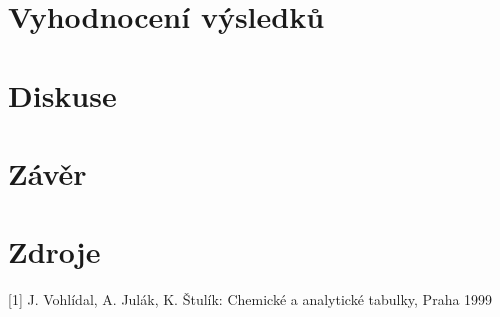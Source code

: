 \documentclass[12pt,a4paper]{article}
\begin{document}
\section*{Vyhodnocení výsledků}	
\section*{Diskuse}
\section*{Závěr}
\section*{Zdroje}
[1] J. Vohlídal, A. Julák, K. Štulík: Chemické a analytické tabulky, Praha 1999
\end{document}
